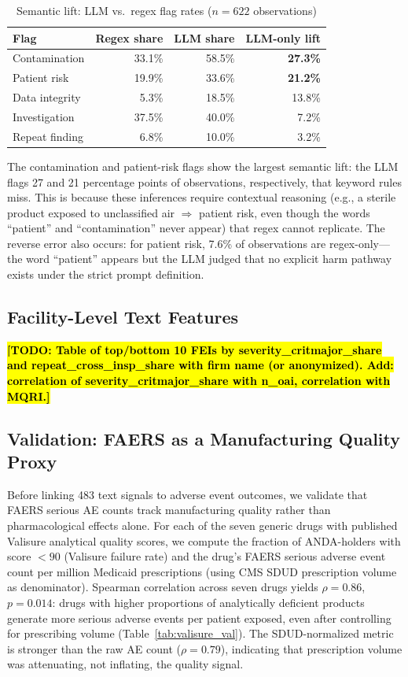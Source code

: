 \documentclass[12pt]{article}
\newcommand{\todo}[1]{\hl{\textbf{[TODO: #1]}}}
\begin{document}
\begin{table}[h!]
\centering
\caption{Semantic lift: LLM vs.\ regex flag rates ($n = 622$ observations)}
\label{tab:lift}
\begin{tabular}{lrrr}
\toprule
\textbf{Flag} & \textbf{Regex share} & \textbf{LLM share}
              & \textbf{LLM-only lift} \\
\midrule
Contamination  & 33.1\% & 58.5\% & \textbf{27.3\%} \\
Patient risk   & 19.9\% & 33.6\% & \textbf{21.2\%} \\
Data integrity &  5.3\% & 18.5\% & 13.8\% \\
Investigation  & 37.5\% & 40.0\% &  7.2\% \\
Repeat finding &  6.8\% & 10.0\% &  3.2\% \\
\bottomrule
\end{tabular}
\end{table}

The contamination and patient-risk flags show the largest semantic lift:
the LLM flags 27 and 21 percentage points of observations, respectively,
that keyword rules miss.
This is because these inferences require contextual reasoning
(e.g., a sterile product exposed to unclassified air $\Rightarrow$ patient
risk, even though the words ``patient'' and ``contamination'' never appear)
that regex cannot replicate.
The reverse error also occurs: for patient risk, 7.6\% of observations are
regex-only---the word ``patient'' appears but the LLM judged that no
explicit harm pathway exists under the strict prompt definition.

\subsection{Facility-Level Text Features}

\todo{Table of top/bottom 10 FEIs by severity\_critmajor\_share and
repeat\_cross\_insp\_share with firm name (or anonymized).
Add: correlation of severity\_critmajor\_share with n\_oai,
correlation with MQRI.}

\subsection{Validation: FAERS as a Manufacturing Quality Proxy}

Before linking 483 text signals to adverse event outcomes, we validate that
FAERS serious AE counts track manufacturing quality rather than pharmacological
effects alone.
For each of the seven generic drugs with published Valisure analytical quality
scores, we compute the fraction of ANDA-holders with score $< 90$ (Valisure
failure rate) and the drug's FAERS serious adverse event count per million
Medicaid prescriptions (using CMS SDUD prescription volume as denominator).
Spearman correlation across seven drugs yields $\rho = 0.86$, $p = 0.014$:
drugs with higher proportions of analytically deficient products generate more
serious adverse events per patient exposed, even after controlling for
prescribing volume (Table~\ref{tab:valisure_val}).
The SDUD-normalized metric is stronger than the raw AE count ($\rho = 0.79$),
indicating that prescription volume was attenuating, not inflating, the
quality signal.
\end{document}
